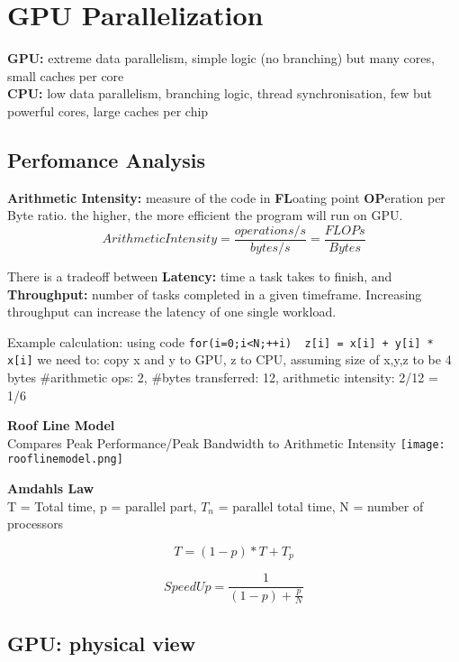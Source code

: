 \section{GPU Parallelization}
\textbf{GPU:} extreme data parallelism, simple logic (no branching) but many cores, small caches per core \\
\textbf{CPU:} low data parallelism, branching logic, thread synchronisation, few but powerful cores, large caches per chip

\subsection{Perfomance Analysis}
\textbf{Arithmetic Intensity:} measure of the code in \textbf{FL}oating point \textbf{OP}eration per Byte ratio. the higher, the more efficient the program will run on GPU. 
\[ ArithmeticIntensity = \frac{operations/s}{bytes/s} = \frac{FLOPs}{Bytes} \]

There is a tradeoff between \textbf{Latency:} time a task takes to finish, and \textbf{Throughput:} number of tasks completed in a given timeframe. Increasing throughput can increase the latency of one single workload.

Example calculation: using code 
\texttt{for(i=0;i<N;++i) { z[i] = x[i] + y[i] * x[i]}}
we need to: copy x and y to GPU, z to CPU, assuming size of x,y,z to be 4 bytes
\#arithmetic ops: 2, \#bytes transferred: 12, arithmetic intensity: 2/12 = 1/6

\textbf{Roof Line Model}\\
Compares Peak Performance/Peak Bandwidth to Arithmetic Intensity
\texttt{[image: rooflinemodel.png]}

\textbf{Amdahls Law}\\
T = Total time, p = parallel part, $T_n$ = parallel total time, N = number of processors
\begin{minipage}[t]{0.5\linewidth}
  \vspace{-2mm}
  \[ T = (1-p) * T + T_p \]
\end{minipage}
\begin{minipage}[t]{0.5\linewidth}
  \vspace{-2mm}
	\[ SpeedUp = \frac{1}{(1-p) + \frac{p}{N}} \]
\end{minipage}

\subsection{GPU: physical view}

